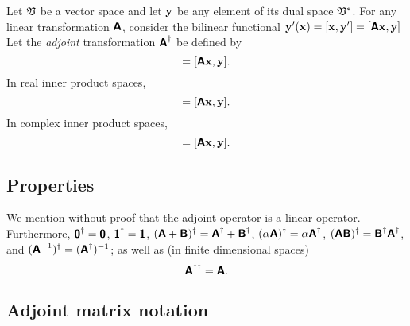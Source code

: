 Let ${\frak V}$ be a vector space and let ${\bf y}$
be any element of its dual space ${\frak V}^\ast$.
For any linear transformation $\textsf{\textbf{A}}$, consider
the bilinear functional
${\bf y}' ({\bf x}) =[{\bf x} ,{\bf y}'] =[\textsf{\textbf{A}}{\bf x},{\bf y}]$
Let the {\em adjoint} transformation $\textsf{\textbf{A}}^\dagger$ be defined by
\begin{equation}
[{\bf x},\textsf{\textbf{A}}^\ast{\bf y}]=
[\textsf{\textbf{A}}{\bf x},{\bf y}].
\end{equation}
In real inner product spaces,
\begin{equation}
[{\bf x},\textsf{\textbf{A}}^T{\bf y}]=
[\textsf{\textbf{A}}{\bf x},{\bf y}].
\end{equation}
In complex inner product spaces,
\begin{equation}
[{\bf x},\textsf{\textbf{A}}^\dagger{\bf y}]=
[\textsf{\textbf{A}}{\bf x},{\bf y}].
\end{equation}


\subsection{Properties}
We mention without proof that the adjoint operator is a linear operator.
Furthermore,
$\textsf{\textbf{0}}^\dagger = \textsf{\textbf{0}}$,
$\textsf{\textbf{1}}^\dagger = \textsf{\textbf{1}}$,
$(\textsf{\textbf{A}}+\textsf{\textbf{B}})^\dagger = \textsf{\textbf{A}}^\dagger+\textsf{\textbf{B}}^\dagger$,
$(\alpha \textsf{\textbf{A}})^\dagger = \alpha \textsf{\textbf{A}}^\dagger$,
$( \textsf{\textbf{A}}\textsf{\textbf{B}})^\dagger =   \textsf{\textbf{B}}^\dagger
 \textsf{\textbf{A}}^\dagger$,
and
$( \textsf{\textbf{A}}^{-1})^\dagger
=
( \textsf{\textbf{A}}^\dagger )^{-1}
$;
as well as  (in finite dimensional spaces)
\begin{equation}
\textsf{\textbf{A}}^{\dagger \dagger}=
\textsf{\textbf{A}}.
\end{equation}

\subsection{Adjoint matrix notation}

